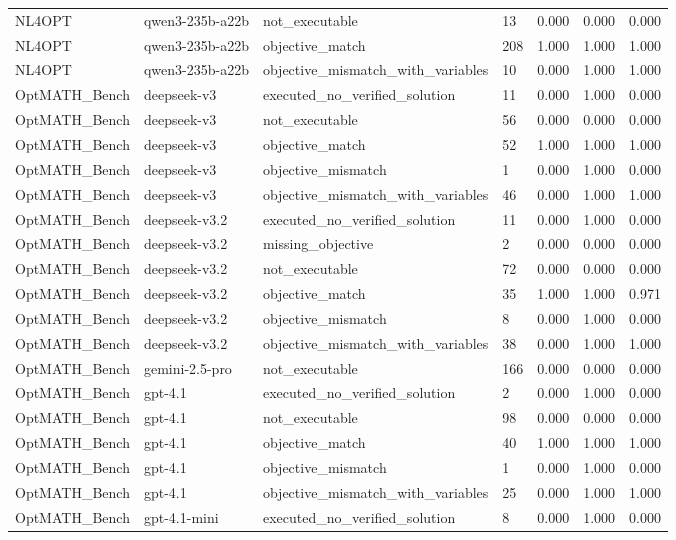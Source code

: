 \begin{table}[t]
\begin{tabular}{lllllll}
NL4OPT & qwen3-235b-a22b & not\_executable & 13 & 0.000 & 0.000 & 0.000 \\
NL4OPT & qwen3-235b-a22b & objective\_match & 208 & 1.000 & 1.000 & 1.000 \\
NL4OPT & qwen3-235b-a22b & objective\_mismatch\_with\_variables & 10 & 0.000 & 1.000 & 1.000 \\
OptMATH\_Bench & deepseek-v3 & executed\_no\_verified\_solution & 11 & 0.000 & 1.000 & 0.000 \\
OptMATH\_Bench & deepseek-v3 & not\_executable & 56 & 0.000 & 0.000 & 0.000 \\
OptMATH\_Bench & deepseek-v3 & objective\_match & 52 & 1.000 & 1.000 & 1.000 \\
OptMATH\_Bench & deepseek-v3 & objective\_mismatch & 1 & 0.000 & 1.000 & 0.000 \\
OptMATH\_Bench & deepseek-v3 & objective\_mismatch\_with\_variables & 46 & 0.000 & 1.000 & 1.000 \\
OptMATH\_Bench & deepseek-v3.2 & executed\_no\_verified\_solution & 11 & 0.000 & 1.000 & 0.000 \\
OptMATH\_Bench & deepseek-v3.2 & missing\_objective & 2 & 0.000 & 0.000 & 0.000 \\
OptMATH\_Bench & deepseek-v3.2 & not\_executable & 72 & 0.000 & 0.000 & 0.000 \\
OptMATH\_Bench & deepseek-v3.2 & objective\_match & 35 & 1.000 & 1.000 & 0.971 \\
OptMATH\_Bench & deepseek-v3.2 & objective\_mismatch & 8 & 0.000 & 1.000 & 0.000 \\
OptMATH\_Bench & deepseek-v3.2 & objective\_mismatch\_with\_variables & 38 & 0.000 & 1.000 & 1.000 \\
OptMATH\_Bench & gemini-2.5-pro & not\_executable & 166 & 0.000 & 0.000 & 0.000 \\
OptMATH\_Bench & gpt-4.1 & executed\_no\_verified\_solution & 2 & 0.000 & 1.000 & 0.000 \\
OptMATH\_Bench & gpt-4.1 & not\_executable & 98 & 0.000 & 0.000 & 0.000 \\
OptMATH\_Bench & gpt-4.1 & objective\_match & 40 & 1.000 & 1.000 & 1.000 \\
OptMATH\_Bench & gpt-4.1 & objective\_mismatch & 1 & 0.000 & 1.000 & 0.000 \\
OptMATH\_Bench & gpt-4.1 & objective\_mismatch\_with\_variables & 25 & 0.000 & 1.000 & 1.000 \\
OptMATH\_Bench & gpt-4.1-mini & executed\_no\_verified\_solution & 8 & 0.000 & 1.000 & 0.000 \\

\end{tabular}
\end{table}
